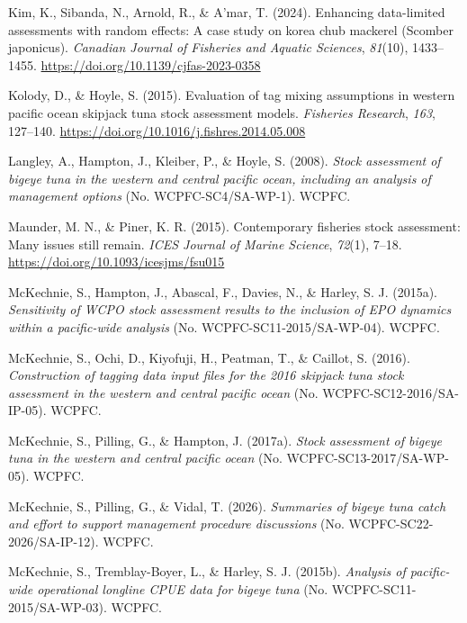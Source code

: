 \documentclass[
  english,
  a4paper,
  a4paper,
  11pt]{SCreport}
\newlength{\cslhangindent}
\newenvironment{CSLReferences}[2] %
 {\begin{list}{}{%
  \setlength{\itemindent}{0pt}
  \setlength{\leftmargin}{0pt}
  \setlength{\parsep}{0pt}
  \ifodd #1
   \setlength{\leftmargin}{\cslhangindent}
   \setlength{\itemindent}{-1\cslhangindent}
  \fi
  \setlength{\itemsep}{#2\baselineskip}}}
 {\end{list}}
\begin{document}
\begin{CSLReferences}{1}{0}
Kim, K., Sibanda, N., Arnold, R., \& A'mar, T. (2024). Enhancing
data-limited assessments with random effects: A case study on korea chub
mackerel ({Scomber japonicus}). \emph{Canadian Journal of Fisheries and
Aquatic Sciences}, \emph{81}(10), 1433--1455.
\url{https://doi.org/10.1139/cjfas-2023-0358}

Kolody, D., \& Hoyle, S. (2015). Evaluation of tag mixing assumptions in
western pacific ocean skipjack tuna stock assessment models.
\emph{Fisheries Research}, \emph{163}, 127--140.
\url{https://doi.org/10.1016/j.fishres.2014.05.008}

Langley, A., Hampton, J., Kleiber, P., \& Hoyle, S. (2008). \emph{Stock
assessment of bigeye tuna in the western and central pacific ocean,
including an analysis of management options} (No.
{WCPFC}-{SC}4/{SA}-{WP}-1). WCPFC.

Maunder, M. N., \& Piner, K. R. (2015). Contemporary fisheries stock
assessment: Many issues still remain. \emph{ICES Journal of Marine
Science}, \emph{72}(1), 7--18.
\url{https://doi.org/10.1093/icesjms/fsu015}

McKechnie, S., Hampton, J., Abascal, F., Davies, N., \& Harley, S. J.
(2015a). \emph{Sensitivity of {WCPO} stock assessment results to the
inclusion of {EPO} dynamics within a pacific-wide analysis} (No.
{WCPFC}-{SC}11-2015/{SA}-{WP}-04). WCPFC.

McKechnie, S., Ochi, D., Kiyofuji, H., Peatman, T., \& Caillot, S.
(2016). \emph{Construction of tagging data input files for the 2016
skipjack tuna stock assessment in the western and central pacific ocean}
(No. {WCPFC}-{SC}12-2016/{SA}-{IP}-05). WCPFC.

McKechnie, S., Pilling, G., \& Hampton, J. (2017a). \emph{Stock
assessment of bigeye tuna in the western and central pacific ocean} (No.
{WCPFC}-{SC}13-2017/{SA}-{WP}-05). WCPFC.

McKechnie, S., Pilling, G., \& Vidal, T. (2026). \emph{Summaries of
bigeye tuna catch and effort to support management procedure
discussions} (No. {WCPFC}-{SC}22-2026/{SA}-{IP}-12). WCPFC.

McKechnie, S., Tremblay-Boyer, L., \& Harley, S. J. (2015b).
\emph{Analysis of pacific-wide operational longline {CPUE} data for
bigeye tuna} (No. {WCPFC}-{SC}11-2015/{SA}-{WP}-03). WCPFC.


\end{CSLReferences}
\end{document}
